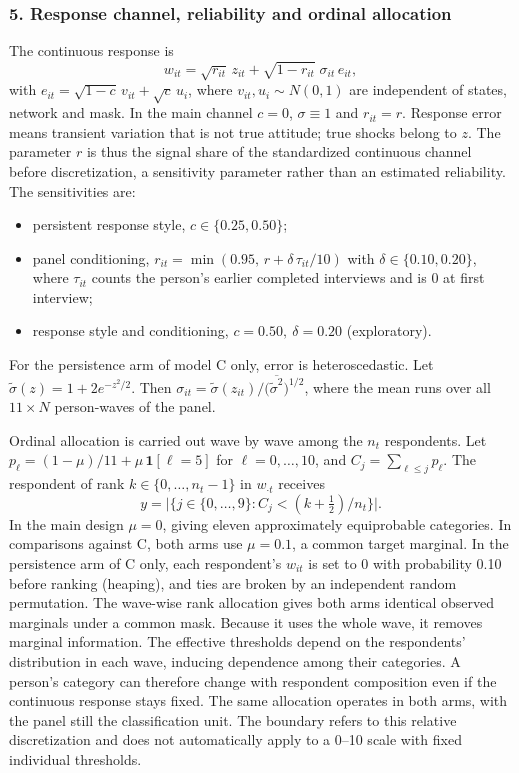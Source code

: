 \subsubsection*{5. Response channel, reliability and ordinal allocation}
The continuous response is
\begin{equation*}
w_{it}=\sqrt{r_{it}}\,z_{it}+\sqrt{1-r_{it}}\;\sigma_{it}\,e_{it},
\end{equation*}
with $e_{it}=\sqrt{1-c}\,v_{it}+\sqrt c\,u_i$, where $v_{it},u_i\sim N(0,1)$ are independent of states, network and mask. In the main channel $c=0$, $\sigma\equiv1$ and $r_{it}=r$. Response error means transient variation that is not true attitude; true shocks belong to $z$. The parameter $r$ is thus the signal share of the standardized continuous channel before discretization, a sensitivity parameter rather than an estimated reliability. The sensitivities are:
\begin{itemize}
\item persistent response style, $c\in\{0.25,0.50\}$;
\item panel conditioning, $r_{it}=\min(0.95,\,r+\delta\,\tau_{it}/10)$ with $\delta\in\{0.10,0.20\}$, where $\tau_{it}$ counts the person's earlier completed interviews and is 0 at first interview;
\item response style and conditioning, $c=0.50,\ \delta=0.20$ (exploratory).
\end{itemize}
For the persistence arm of model C only, error is heteroscedastic. Let $\tilde\sigma(z)=1+2e^{-z^2/2}$. Then $\sigma_{it}=\tilde\sigma(z_{it})\big/\bigl(\overline{\tilde\sigma^2}\bigr)^{1/2}$, where the mean runs over all $11\times N$ person-waves of the panel.

Ordinal allocation is carried out wave by wave among the $n_t$ respondents. Let $p_\ell=(1-\mu)/11+\mu\,\mathbf 1[\ell=5]$ for $\ell=0,\ldots,10$, and $C_j=\sum_{\ell\le j}p_\ell$. The respondent of rank $k\in\{0,\ldots,n_t-1\}$ in $w_{\cdot t}$ receives
\begin{equation*}
y=\bigl|\{j\in\{0,\ldots,9\}:C_j<(k+\tfrac12)/n_t\}\bigr|.
\end{equation*}
In the main design $\mu=0$, giving eleven approximately equiprobable categories. In comparisons against C, both arms use $\mu=0.1$, a common target marginal. In the persistence arm of C only, each respondent's $w_{it}$ is set to 0 with probability 0.10 before ranking (heaping), and ties are broken by an independent random permutation. The wave-wise rank allocation gives both arms identical observed marginals under a common mask. Because it uses the whole wave, it removes marginal information.
The effective thresholds depend on the respondents' distribution in each wave, inducing dependence among their categories. A person's category can therefore change with respondent composition even if the continuous response stays fixed. The same allocation operates in both arms, with the panel still the classification unit. The boundary refers to this relative discretization and does not automatically apply to a 0--10 scale with fixed individual thresholds. %

